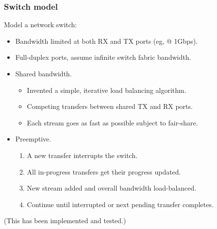 \documentclass[xcolor=dvipsnames]{beamer}
\begin{document}
\begin{frame}
  \frametitle{Switch model}
  Model a network switch:

  \begin{itemize}
  \item Bandwidth limited at both RX and TX ports  (eg, @ 1Gbps).
  \item Full-duplex ports, assume infinite switch fabric bandwidth.
  \item Shared bandwidth.
    \begin{itemize}
    \item Invented a simple, iterative load balancing algorithm.
    \item Competing transfers between shared TX and RX ports.
    \item Each stream goes as fast as possible subject to fair-share.
    \end{itemize}
  \item Preemptive.
    \begin{enumerate}
    \item A new transfer interrupts the switch.
    \item All in-progress transfers get their progress updated.
    \item New stream added and overall bandwidth load-balanced.
    \item Continue until interrupted or next pending transfer completes.
    \end{enumerate}
  \end{itemize}

  (This has been implemented and tested.)
\end{frame}
\end{document}
